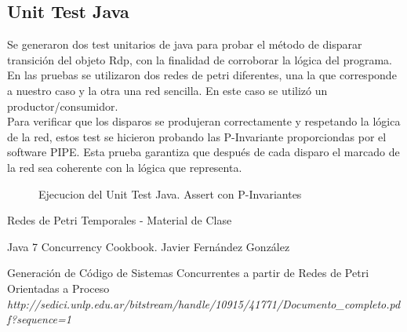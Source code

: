 \documentclass[10pt, a4paper,notitlepage]{article}
\begin{document}
\subsection{Unit Test Java}
Se generaron dos test unitarios de java para probar el método de disparar transición del objeto Rdp, con la finalidad de corroborar la lógica del programa. En las pruebas se utilizaron dos redes de petri diferentes, una la que corresponde a nuestro caso y la otra una red sencilla. En este caso se utilizó un productor/consumidor.\\
Para verificar que los disparos se produjeran correctamente y respetando la lógica de la red, estos test se hicieron probando las P-Invariante proporciondas por el software PIPE. Esta prueba garantiza que después de cada disparo el marcado de la red sea coherente con la lógica que representa.
\begin{figure}[H] %
	\caption{Ejecucion del Unit Test Java. Assert con P-Invariantes}
	\label{fig:test_rdp_ok}
\end{figure}

\begin{thebibliography}{100} %
 Redes de Petri Temporales - Material de Clase

Java 7 Concurrency Cookbook. Javier Fernández González

 Generación de Código de Sistemas Concurrentes a partir de Redes de Petri Orientadas a Proceso \emph{http://sedici.unlp.edu.ar/bitstream/handle/10915/41771/Documento\_completo.pdf?sequence=1} 


\end{thebibliography}
\end{document}
